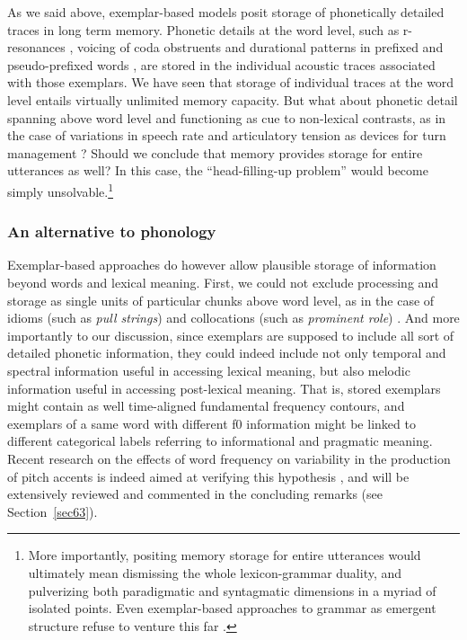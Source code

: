 As we said above, exemplar-based models posit storage of phonetically detailed traces in long term memory. Phonetic details at the word level, such as r-resonances \citep{heinrich2010influence}, voicing of coda obstruents  \citep{hawkins2004influence} and durational patterns in prefixed and pseudo-prefixed words \citep{smith2012phonetic}, are stored in the individual acoustic traces associated with those exemplars. We have seen that storage of individual traces at the word level entails virtually unlimited memory capacity. But what about phonetic detail spanning above word level and functioning as cue to non-lexical contrasts, as in the case of variations in speech rate and articulatory tension as devices for turn management \citep{local2003phonetics}? Should we conclude that memory provides storage for entire utterances as well? In this case, the ``head-filling-up problem'' \citep{johnson1997speech} would become simply unsolvable.\footnote{More importantly, positing memory storage for entire utterances would ultimately mean dismissing the whole lexicon-grammar duality, and pulverizing both paradigmatic and syntagmatic dimensions in a myriad of isolated points. Even exemplar-based approaches to grammar as emergent structure refuse to venture this far \citep{bybee2001phonology}.}

\subsubsection{An alternative to phonology}\label{sec1131}
Exemplar-based approaches do however allow plausible storage of information beyond words and lexical meaning. First, we could not exclude processing and storage as single units of particular chunks above word level, as in the case of idioms (such as \textit{pull strings}) and collocations (such as \textit{prominent role}) \citep{bybee2006usage}. And more importantly to our discussion, since exemplars are supposed to include all sort of detailed phonetic information, they could indeed include not only temporal and spectral information useful in accessing lexical meaning, but also melodic information useful in accessing post-lexical meaning. That is, stored exemplars might contain as well time-aligned fundamental frequency contours, and exemplars of a same word with different f0 information might be linked to different categorical labels referring to informational and pragmatic meaning. Recent research on the effects of word frequency on variability in the production of pitch accents is indeed aimed at verifying this hypothesis \citep{walsh2008examining,schweitzer2009frequency,schweitzer2010frequency}, and will be extensively reviewed and commented in the concluding remarks (see Section~\ref{sec63}). 

